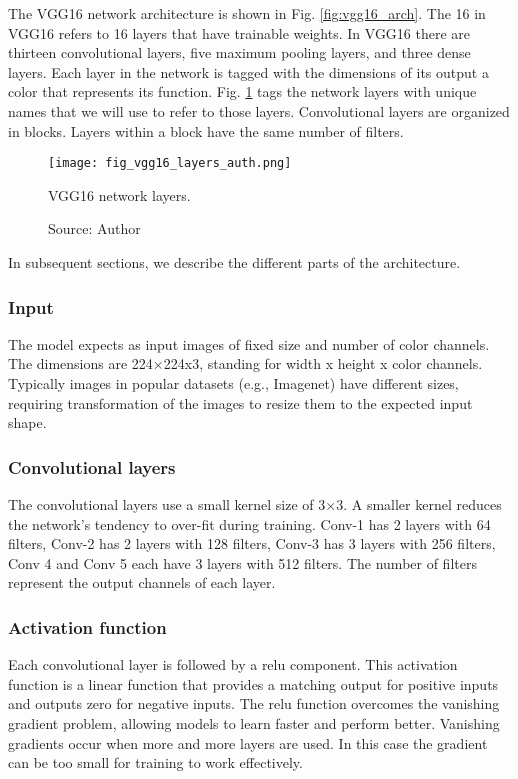 The VGG16 network architecture is shown in Fig. \ref{fig:vgg16_arch}. The 16 in VGG16 refers to 16 layers that have trainable weights. In VGG16 there are thirteen convolutional layers, five maximum pooling layers, and three dense layers. Each layer in the network is tagged with the dimensions of its output a color that represents its function. Fig. \ref{fig:vgg16_layers_auth} tags the network layers with unique names that we will use to refer to those layers. Convolutional layers are organized in blocks. Layers within a block have the same number of filters.
\begin{figure}[ht]
    \begin{center}       
    \texttt{[image: fig\_vgg16\_layers\_auth.png]}
    \caption[VGG16 network layers]{VGG16 network layers.}
    \caption*{Source: Author}
    \label{fig:vgg16_layers_auth}
    \end{center}
\end{figure}

In subsequent sections, we describe the different parts of the architecture.
\subsubsection{Input}
The model expects as input images of fixed size and number of color channels. The dimensions are 224×224x3, standing for width x height x color channels. Typically images in popular datasets (e.g., Imagenet) have different sizes, requiring transformation of the images to resize them to the expected input shape.

\subsubsection{Convolutional layers}
The convolutional layers use a small kernel size of 3×3. A smaller kernel reduces the network’s tendency to over-fit during training. Conv-1 has 2 layers with 64 filters, Conv-2 has 2 layers with 128 filters, Conv-3 has 3 layers with 256 filters, Conv 4 and Conv 5 each have 3 layers with 512 filters. The number of filters represent the output channels of each layer.

\subsubsection{Activation function}
Each convolutional layer is followed by a \acrfull{relu} component. This activation function is a linear function that provides a matching output for positive inputs and outputs zero for negative inputs. The \acrshort{relu} function overcomes the vanishing gradient problem, allowing models to learn faster and perform better. Vanishing gradients occur when more and more layers are used. In this case the gradient can be too small for training to work effectively.

